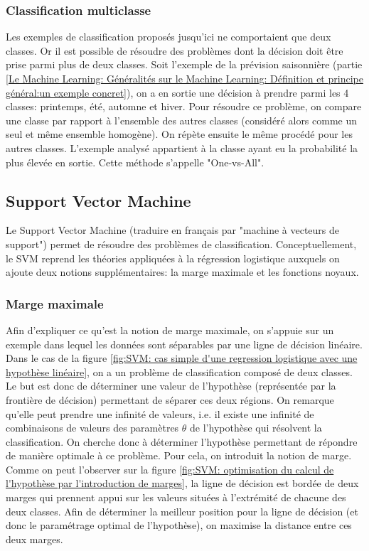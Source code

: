 \subsubsection{Classification multiclasse}
\label{Le Machine Learning: Les différents algorithmes: La regression logistique: La classification multi-classe}
Les exemples de classification proposés jusqu'ici ne comportaient que deux classes. Or il est possible de résoudre des problèmes dont la décision doit être prise parmi plus de deux classes. Soit l'exemple de la prévision saisonnière (partie \ref{Le Machine Learning: Généralités sur le Machine Learning: Définition et principe général:un exemple concret}), on a en sortie une décision à prendre parmi les 4 classes: printemps, été, automne et hiver. Pour résoudre ce problème, on compare une classe par rapport à l'ensemble des autres classes (considéré alors comme un seul et même ensemble homogène). On répète ensuite le même procédé pour les autres classes. L'exemple analysé appartient à la classe ayant eu la probabilité la plus élevée en sortie. Cette méthode s'appelle "One-vs-All".


\subsection{Support Vector Machine}
\label{Le Machine Learning: Les différents algorithmes: SVM}
Le Support Vector Machine (traduire en français par "machine à vecteurs de support") permet de résoudre des problèmes de classification. Conceptuellement, le SVM reprend les théories appliquées à la régression logistique auxquels on ajoute deux notions supplémentaires: la marge maximale et les fonctions noyaux.

\subsubsection{Marge maximale}
\label{Le Machine Learning: Les différents algorithmes: SVM: la marge maximale}
Afin d'expliquer ce qu'est la notion de marge maximale, on s'appuie sur un exemple dans lequel les données sont séparables par une ligne de décision linéaire. Dans le cas de la figure \ref{fig:SVM: cas simple d'une regression logistique avec une hypothèse linéaire}, on a un problème de classification composé de deux classes. Le but est donc de déterminer une valeur de l'hypothèse (représentée par la frontière de décision) permettant de séparer ces deux régions. On remarque qu'elle peut prendre une infinité de valeurs, i.e. il existe une infinité de combinaisons de valeurs des paramètres $\theta$ de l'hypothèse qui résolvent la classification. On cherche donc à déterminer l'hypothèse permettant de répondre de manière optimale à ce problème. Pour cela, on introduit la notion de marge. Comme on peut l'observer sur la figure \ref{fig:SVM: optimisation du calcul de l'hypothèse par l'introduction de marges}, la ligne de décision est bordée de deux marges qui prennent appui sur les valeurs situées à l'extrémité de chacune des deux classes. Afin de déterminer la meilleur position pour la ligne de décision (et donc le paramétrage optimal de l'hypothèse), on maximise la distance entre ces deux marges. 

